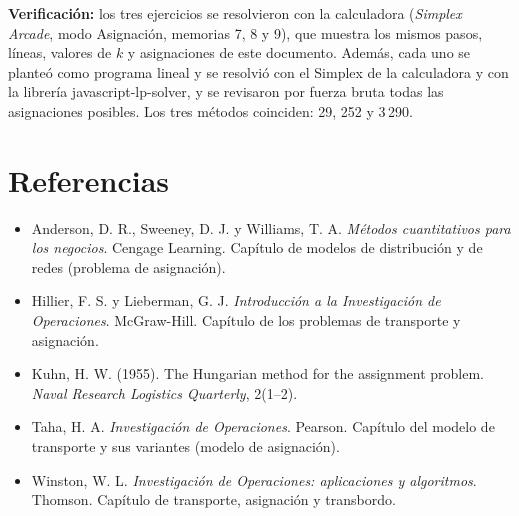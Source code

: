 \documentclass[11pt,a4paper]{article}
\begin{document}
\textbf{Verificación:} los tres ejercicios se resolvieron con la calculadora (\emph{Simplex Arcade}, modo
Asignación, memorias 7, 8 y 9), que muestra los mismos pasos, líneas, valores de $k$ y asignaciones de este documento.
Además, cada uno se planteó como programa lineal y se resolvió con el Simplex de la calculadora y con la librería
javascript-lp-solver, y se revisaron por fuerza bruta todas las asignaciones posibles. Los tres métodos coinciden:
29, 252 y 3\,290.

\section*{Referencias}
\begin{itemize}[leftmargin=*, itemsep=1pt]\small
  \item Anderson, D. R., Sweeney, D. J. y Williams, T. A. \textit{Métodos cuantitativos para los negocios}. Cengage Learning. Capítulo de modelos de distribución y de redes (problema de asignación).
  \item Hillier, F. S. y Lieberman, G. J. \textit{Introducción a la Investigación de Operaciones}. McGraw-Hill. Capítulo de los problemas de transporte y asignación.
  \item Kuhn, H. W. (1955). The Hungarian method for the assignment problem. \textit{Naval Research Logistics Quarterly}, 2(1--2).
  \item Taha, H. A. \textit{Investigación de Operaciones}. Pearson. Capítulo del modelo de transporte y sus variantes (modelo de asignación).
  \item Winston, W. L. \textit{Investigación de Operaciones: aplicaciones y algoritmos}. Thomson. Capítulo de transporte, asignación y transbordo.
\end{itemize}
\end{document}
